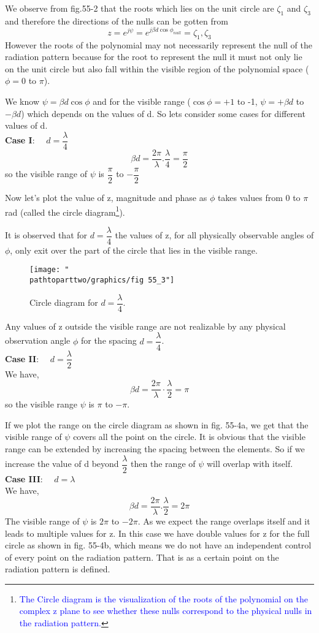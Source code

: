 We observe from fig.55-2 that the roots which lies on the unit circle are $\zeta_1$ and $\zeta_3$ and therefore the directions of the nulls can be gotten from $$z=e^{j\psi}=e^{j\beta d\cos\phi_{null}}=\zeta_1, \zeta_3$$ However the roots of the polynomial may not necessarily represent the null of the radiation pattern because for the root to represent the null it  must not only lie on the unit circle but also fall within the visible region of the polynomial space ($\phi=0$ to $\pi$).

We know $\psi=\beta d\cos\phi$ and for the visible range ($\cos\phi=+1$ to -1, $\psi=+\beta d$ to $-\beta d$) which depends on the values of d. So lets consider some cases for different values of d.\\
\textbf{Case I}: $\quad d=\dfrac{\lambda}{4}$
$$\beta d=\dfrac{2\pi}{\lambda}.\dfrac{\lambda}{4}=\dfrac{\pi}{2}$$ so the visible range of $\psi$ is $\dfrac{\pi}{2}$ to $-\dfrac{\pi}{2}$

Now let's plot the value of z, magnitude and phase as $\phi$ takes values from 0 to $\pi$ rad (called the circle diagram\footnote{\textcolor{blue}{The Circle diagram is the visualization of the roots of the polynomial on the complex z plane to see whether these nulls correspond to the physical nulls in the radiation pattern.}}).

It is observed that for $d=\dfrac{\lambda}{4}$ the values of z, for all physically observable angles of $\phi$, only exit over the part of the circle that lies in the visible range.
\begin{figure}[h]
\centering
\texttt{[image: "\\pathtoparttwo/graphics/fig 55\_3"]}
\caption{  Circle diagram for $d=\dfrac{\lambda}{4}$.}
\label{fig:fig-55-3}
\end{figure}

Any values of z outside the visible range are not realizable by any physical observation angle $\phi$ for the spacing $d=\dfrac{\lambda}{4}$.\\
\textbf{Case II}: $\quad d=\dfrac{\lambda}{2}$\\
We have, $$\beta d=\dfrac{2\pi}{\lambda}\cdot \frac{\lambda}{2} = \pi$$
so the visible range $\psi$ is $\pi$ to $-\pi$.

If we plot the range on the circle diagram as shown in fig. 55-4a, we get that the visible range of $\psi$ covers all the point on the circle. It is obvious that the visible range can be extended by increasing the spacing between the elements. So if we increase the value of d beyond $\dfrac{\lambda}{2}$ then the range of $\psi$ will overlap with itself.\\
\textbf{Case III}: $\quad d=\lambda$\\
We have, $$\beta d=\dfrac{2\pi}{\lambda}.\dfrac{\lambda}{2} = 2\pi$$
The visible range of $\psi$ is $2\pi$ to $-2\pi$. As we expect the range overlaps itself and it leads to multiple values for z. In this case we have double values for z for the full circle as shown in fig. 55-4b, which means we do not have an independent control of every point on the radiation pattern. That is as a certain point on the radiation pattern is defined.
